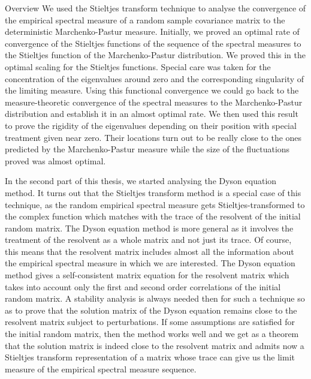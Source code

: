 \documentclass[11pt, a4paper, oneside]{book}
\numberwithin{equation}{chapter}
\begin{document}
\begin{section}{Overview}
We used the Stieltjes transform technique to analyse the convergence of the empirical spectral measure of a random sample covariance matrix to the deterministic Marchenko-Pastur measure. Initially, we proved an optimal rate of convergence of the Stieltjes functions of the sequence of the spectral measures to the Stieltjes function of the Marchenko-Pastur distribution. We proved this in the optimal scaling for the Stieltjes functions. Special care was taken for the concentration of the eigenvalues around zero and the corresponding singularity of the limiting measure. Using this functional convergence we could go back to the measure-theoretic convergence of the spectral measures to the Marchenko-Pastur distribution and establish it in an almost optimal rate. We then used this result to prove the rigidity of the eigenvalues depending on their position with special treatment given near zero. Their locations turn out to be really close to the ones predicted by the Marchenko-Pastur measure while the size of the fluctuations proved was almost optimal.

In the second part of this thesis, we started analysing the Dyson equation method. It turns out that the Stieltjes transform method is a special case of this technique, as the random empirical spectral measure gets Stieltjes-transformed to the complex function which matches with the trace of the resolvent of the initial random matrix. The Dyson equation method is more general as it involves the treatment of the resolvent as a whole matrix and not just its trace. Of course, this means that the resolvent matrix includes almost all the information about the empirical spectral measure in which we are interested. The Dyson equation method gives a self-consistent matrix equation for the resolvent matrix which takes into account only the first and second order correlations of the initial random matrix. A stability analysis is always needed then for such a technique so as to prove that the solution matrix of the Dyson equation remains close to the resolvent matrix subject to perturbations. If some assumptions are satisfied for the initial random matrix, then the method works well and we get as a theorem that the solution matrix is indeed close to the resolvent matrix and admits now a Stieltjes transform representation of a matrix whose trace can give us the limit measure of the empirical spectral measure sequence.


\end{section}
\end{document}
